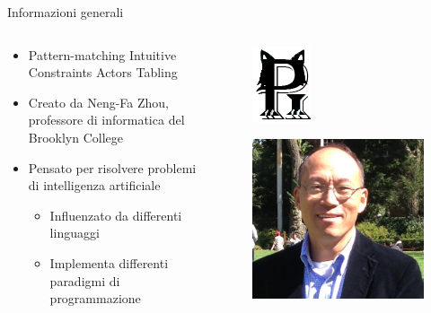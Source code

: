 \begin{frame}{Informazioni generali}

	\begin{columns}
		\begin{column}{0.8\textwidth}
			\begin{itemize}
				\item Pattern-matching Intuitive Constraints Actors Tabling
				\item Creato da Neng-Fa Zhou, professore di informatica del Brooklyn College
				\item Pensato per risolvere problemi di intelligenza artificiale
					\begin{itemize}
						\item Influenzato da differenti linguaggi
						\item Implementa differenti paradigmi di programmazione
					\end{itemize}
			\end{itemize}
		\end{column}

		\begin{column}{0.3\textwidth}
			
			\begin{figure}
				\centering
				\includegraphics[scale=2.5]{res/picatLogo}
			\end{figure}

			\begin{figure}
				\centering
				\includegraphics[scale=0.22]{res/zhou}
			\end{figure}
		
		\end{column}
	\end{columns}

\end{frame}